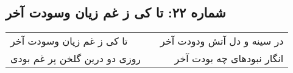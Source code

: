 \begin{center}
\section*{شماره ۲۲: تا کی ز غم زیان وسودت آخر}
\label{sec:022}
\begin{longtable}{l p{0.5cm} r}
تا کی ز غم زیان وسودت آخر
&&
در سینه و دل آتش ودودت آخر
\\
روزی دو درین گلخن پر غم بودی
&&
انگار نبودهای چه بودت آخر
\\
\end{longtable}
\end{center}
